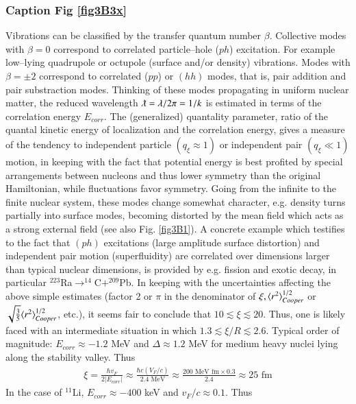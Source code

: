 \begin{subappendices}
         \subsubsection{Caption Fig \ref{fig3B3x}}
         Vibrations can be classified by the transfer quantum number $\beta$. Collective modes with $\beta=0$ correspond to correlated particle--hole ($ph$) excitation. For example low--lying quadrupole or octupole (surface and/or density) vibrations. Modes with  $\beta=\pm2$  correspond to correlated ($pp$) or $(hh)$ modes, that is, pair addition and pair substraction modes.
         Thinking of these modes propagating in uniform nuclear matter, the reduced wavelength $\lambdabar=\lambda/2\pi=1/k$ is estimated in terms of the correlation energy $E_{corr}$. The (generalized) quantality parameter, ratio of the quantal kinetic energy of localization and the correlation energy,  gives a measure of the tendency to independent particle $(q_\xi\approx1)$ or independent pair $(q_\xi\ll1)$ motion, in keeping with the fact that potential energy is best profited by special arrangements between nucleons and thus lower symmetry than the original Hamiltonian, while fluctuations favor symmetry. Going from the infinite to the finite nuclear system, these modes change somewhat character, e.g. density turns partially into surface modes, becoming distorted by the mean field which acts as a strong external field (see also Fig. \ref{fig3B1}). A concrete example which testifies to the fact that $(ph)$ excitations (large amplitude surface distortion) and independent pair motion (superfluidity) are correlated over dimensions larger than typical nuclear dimensions, is provided by e.g. fission and exotic decay, in particular $^{223}$Ra$\rightarrow^{14}$C$+^{209}$Pb. In keeping with the uncertainties affecting the above simple estimates (factor 2 or $\pi$ in the denominator of $\xi,\langle {r^2} \rangle^{1/2}_{Cooper}$ or $\sqrt{\frac{3}{5}}\langle {r^2} \rangle^{1/2}_{Cooper}$, etc.), it seems fair to conclude that $10\lesssim\xi\lesssim20$. Thus, one is likely faced with an intermediate situation in which $1.3\lesssim\xi/R\lesssim2.6.$
         \newpage
 Typical order of magnitude: $E_{corr}\approx -1.2 $ MeV and $\Delta\approx 1.2$ MeV for medium heavy nuclei lying along the stability valley. Thus
 \begin{align}
 \xi=\frac{\hbar v_F}{2|E_{corr}|}\approx\frac{\hbar c(V_F/c)}{2.4\text{ MeV}}\approx\frac{200\text{ MeV fm}\times 0.3}{2.4}\approx 25\text{ fm}
 \end{align} 
 In the case of $^{11}$Li, $E_{corr}\approx-400$ keV and $v_F/c\approx 0.1$. Thus

\end{subappendices}
